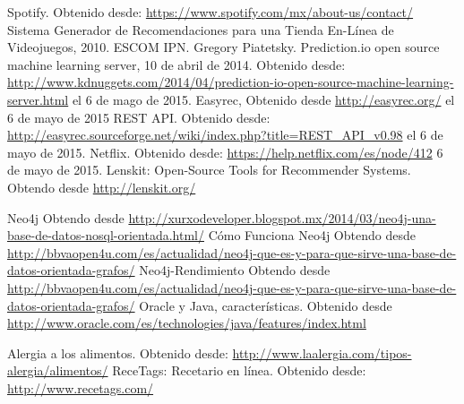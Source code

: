 \begin{thebibliography}{99}
     Spotify. Obtenido desde: \url{https://www.spotify.com/mx/about-us/contact/}
     Sistema Generador de Recomendaciones para una Tienda En-Línea de Videojuegos, 2010. ESCOM IPN. 
    Gregory Piatetsky. Prediction.io open source machine learning server, 10 de abril de 2014. Obtenido desde: \url{http://www.kdnuggets.com/2014/04/prediction-io-open-source-machine-learning-server.html} el 6 de mago de 2015. 
    Easyrec, Obtenido desde \url{http://easyrec.org/} el 6 de mayo de 2015 
    REST API. Obtenido desde: \url{http://easyrec.sourceforge.net/wiki/index.php?title=REST_API_v0.98} el 6 de mayo de 2015. 
    Netflix. Obtenido desde: \url{https://help.netflix.com/es/node/412} 6 de mayo de 2015.
    Lenskit: Open-Source Tools for Recommender Systems. Obtendo desde \url{http://lenskit.org/}

    Neo4j Obtendo desde \url{http://xurxodeveloper.blogspot.mx/2014/03/neo4j-una-base-de-datos-nosql-orientada.html/}
    Cómo Funciona Neo4j Obtendo desde \url{http://bbvaopen4u.com/es/actualidad/neo4j-que-es-y-para-que-sirve-una-base-de-datos-orientada-grafos/}
    Neo4j-Rendimiento Obtendo desde \url{http://bbvaopen4u.com/es/actualidad/neo4j-que-es-y-para-que-sirve-una-base-de-datos-orientada-grafos/}	
    Oracle y Java, características. Obtenido desde \url{http://www.oracle.com/es/technologies/java/features/index.html}

      Alergia a los alimentos. Obtenido desde: \url{http://www.laalergia.com/tipos-alergia/alimentos/}
      ReceTags: Recetario en línea. Obtenido desde: \url{http://www.recetags.com/}


\end{thebibliography}
